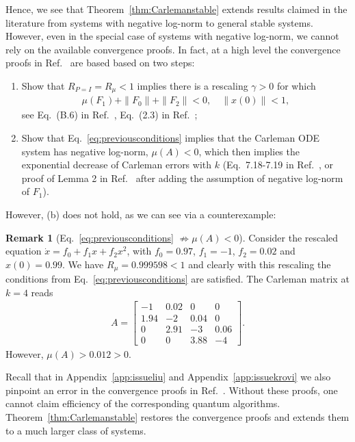 \documentclass[superscriptaddress,onecolumn,nofootinbib,longbibliography,a4paper,accepted=2026-09-29]{quantumarticle}
\theoremstyle{plain}
\theoremstyle{definition}
\newtheorem{rmk}[thm]{Remark}
\numberwithin{thm}{section}
\numberwithin{assumption}{section}
\numberwithin{lemma}{section}
\numberwithin{prop}{section}
\numberwithin{cor}{section}
\numberwithin{definition}{section}
\numberwithin{rmk}{section}
\numberwithin{equation}{section}
\begin{document}
Hence, we see that Theorem~\ref{thm:Carlemanstable} extends results claimed in the literature from systems with negative log-norm to general stable systems. However, even in the special case of systems with negative log-norm, we cannot rely on the available convergence proofs. In fact, at a high level the convergence proofs in Ref.~\cite{liu2021efficient, krovi2023improved} are based based on two steps:
\begin{enumerate}
    \item[(a)] Show that $R_{P=I}= R_\mu <1$ implies there is a rescaling $\gamma>0$ for which
\begin{align}
\label{eq:previousconditions}
    \mu(F_1) + \| F_0\| + \| F_2\| < 0, \quad \|x(0)\|<1,
\end{align}
see Eq.~(B.6) in Ref.~\cite{krovi2023improved}, Eq.~(2.3) in Ref.~\cite{liu2021efficient};
\item[(b)] Show that Eq.~\eqref{eq:previousconditions} implies that the Carleman ODE system has negative log-norm, \mbox{$\mu(A) < 0$},  which then implies the exponential decrease of Carleman errors with $k$ (Eq.~7.18-7.19 in Ref.~\cite{krovi2023improved}, or proof of Lemma 2 in Ref.~\cite{liu2021efficient} after adding the assumption of negative log-norm of $F_1$).
\end{enumerate}  
However, (b) does not hold, as we can see via a counterexample: 
\begin{rmk}[Eq.~\eqref{eq:previousconditions} $\not\Rightarrow  \mu(A) <0$]
    Consider the rescaled equation $\dot{x} = f_0 + f_1 x + f_2 x^2$, with $f_0 = 0.97$, $f_1 = -1$, $f_2 = 0.02$ and $x(0)=0.99$. We have $R_\mu= 0.999598 <1$ and clearly with this rescaling the conditions from Eq.~\eqref{eq:previousconditions} are satisfied. The Carleman matrix at $k =4$ reads
\begin{align}
  A =  \left[\begin{matrix}
  -1 & 0.02 & 0 & 0\\
  1.94 & -2 & 0.04 & 0 \\
  0 & 2.91 & -3 & 0.06 \\
  0 & 0 & 3.88 & -4
\end{matrix}\right].
\end{align}
However, $\mu(A) > 0.012 >0$. 
\end{rmk}
Recall that in Appendix~\ref{app:issueliu} and Appendix~\ref{app:issuekrovi} we also pinpoint an error in the convergence proofs in Ref.~\cite{liu2023efficient, krovi2023improved}. Without these proofs, one cannot claim efficiency of the corresponding quantum algorithms. Theorem~\ref{thm:Carlemanstable} restores the convergence proofs and extends them to a much larger class of systems.
\end{document}
